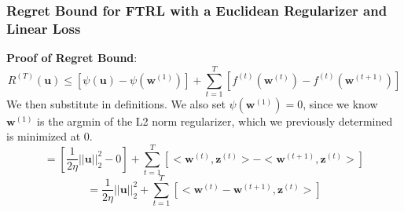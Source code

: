 \documentclass[11pt]{article}
\begin{document}
\subsubsection{Regret Bound for FTRL with a Euclidean Regularizer and Linear Loss}
\textbf{Proof of Regret Bound}:
\begin{equation*}
R^{(T)}(\bm{u}) \leq [\psi(\bm{u}) - \psi(\bm{w}^{(1)})] + \sum^{T}_{t=1}[f^{(t)}(\bm{w}^{(t)}) - f^{(t)}(\bm{w}^{(t+1)})]
\end{equation*}
We then substitute in definitions. We also set $\psi(\bm{w}^{(1)}) = 0$, since we know $\bm{w}^{(1)}$ is the argmin of the L2 norm regularizer, which we previously determined is minimized at 0.
\begin{equation*}
= [\frac{1}{2\eta}||\bm{u}||^2_2 - 0] + \sum^{T}_{t=1}[<\bm{w}^{(t)}, \bm{z}^{(t)}> - <\bm{w}^{(t+1)}, \bm{z}^{(t)}>]
\end{equation*}
\begin{equation*}
= \frac{1}{2\eta}||\bm{u}||^2_2 + \sum^{T}_{t=1}[<\bm{w}^{(t)} - \bm{w}^{(t+1)}, \bm{z}^{(t)}> ]
\end{equation*}
\end{document}

